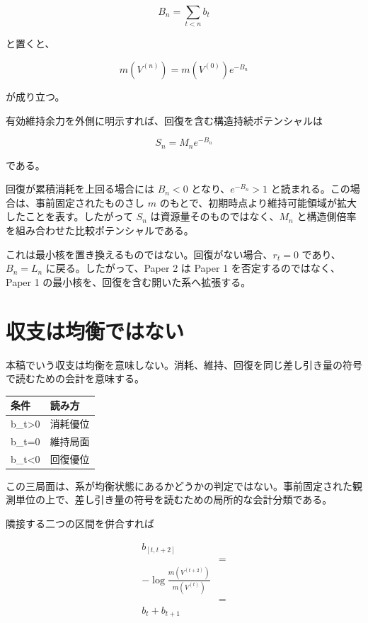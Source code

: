 \documentclass[12pt,a4paper]{article}
\begin{document}
\[
B_{n}=\sum_{t<n} b_{t}
\]

と置くと、

\[
m(V^{(n)})=m(V^{(0)})e^{-B_{n}}
\]

が成り立つ。

有効維持余力を外側に明示すれば、回復を含む構造持続ポテンシャルは

\[
S_{n}=M_{n} e^{-B_{n}}
\]

である。

回復が累積消耗を上回る場合には \(B_{n}<0\) となり、\(e^{-B_{n}}>1\) と読まれる。この場合は、事前固定されたものさし \(m\) のもとで、初期時点より維持可能領域が拡大したことを表す。したがって \(S_{n}\) は資源量そのものではなく、\(M_{n}\) と構造側倍率を組み合わせた比較ポテンシャルである。

これは最小核を置き換えるものではない。回復がない場合、\(r_{t}=0\) であり、\(B_{n}=L_{n}\) に戻る。したがって、Paper 2 は Paper 1 を否定するのではなく、Paper 1 の最小核を、回復を含む開いた系へ拡張する。

\section{収支は均衡ではない}\label{ux53ceux652fux306fux5747ux8861ux3067ux306fux306aux3044}

本稿でいう収支は均衡を意味しない。消耗、維持、回復を同じ差し引き量の符号で読むための会計を意味する。

{\def\LTcaptype{table} %
\begin{longtable}[]{@{}ll@{}}
\toprule\noalign{}
条件 & 読み方 \\
\midrule\noalign{}
\endhead
\bottomrule\noalign{}
\endlastfoot
b\_t\textgreater0 & 消耗優位 \\
b\_t=0 & 維持局面 \\
b\_t\textless0 & 回復優位 \\
\end{longtable}
}

この三局面は、系が均衡状態にあるかどうかの判定ではない。事前固定された観測単位の上で、差し引き量の符号を読むための局所的な会計分類である。

隣接する二つの区間を併合すれば

\[
\begin{aligned}
b_{[t,t+2]} \\
&= \\
-\log\frac{m(V^{(t+2)})}{m(V^{(t)})} \\
&= \\
b_{t}+b_{t+1}
\end{aligned}
\]
\end{document}
